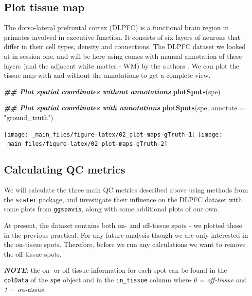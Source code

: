 \documentclass[
]{book}
\newenvironment{Shaded}{\begin{snugshade}}{\end{snugshade}}
\newcommand{\AttributeTok}[1]{\textcolor[rgb]{0.13,0.29,0.53}{#1}}
\newcommand{\DocumentationTok}[1]{\textcolor[rgb]{0.56,0.35,0.01}{\textbf{\textit{#1}}}}
\newcommand{\FunctionTok}[1]{\textcolor[rgb]{0.13,0.29,0.53}{\textbf{#1}}}
\newcommand{\NormalTok}[1]{#1}
\newcommand{\StringTok}[1]{\textcolor[rgb]{0.31,0.60,0.02}{#1}}
\begin{document}
\hypertarget{plot-tissue-map}{%
\subsection{Plot tissue map}\label{plot-tissue-map}}

The dorso-lateral prefrontal cortex (DLPFC) is a functional brain region in primates involved in executive function. It consists of six layers of neurons that differ in their cell types, density and connections. The DLPFC dataset we looked at in session one, and will be here using comes with manual annotation of these layers (and the adjacent white matter - WM) by the authors \citet{Maynard2021Mar}. We can plot the tissue map with and without the annotations to get a complete view.

\begin{Shaded}
\begin{Highlighting}[]
\DocumentationTok{\#\# Plot spatial coordinates without annotations}
\FunctionTok{plotSpots}\NormalTok{(spe)}

\DocumentationTok{\#\# Plot spatial coordinates with annotations}
\FunctionTok{plotSpots}\NormalTok{(spe,}
          \AttributeTok{annotate =} \StringTok{"ground\_truth"}\NormalTok{)}
\end{Highlighting}
\end{Shaded}

\texttt{[image: \_main\_files/figure-latex/02\_plot-maps-gTruth-1]} \texttt{[image: \_main\_files/figure-latex/02\_plot-maps-gTruth-2]}

\hypertarget{calculating-qc-metrics}{%
\subsection{Calculating QC metrics}\label{calculating-qc-metrics}}

We will calculate the three main QC metrics described above using methods from the \texttt{scater} \citep{McCarthy2017Apr} package, and investigate their influence on the DLPFC dataset with some plots from \texttt{ggspavis}, along with some additional plots of our own.

At present, the dataset contains both on- and off-tissue spots - we plotted these in the previous practical. For any future analysis though we are only interested in the on-tissue spots. Therefore, before we run any calculations we want to remove the off-tissue spots.

\textbf{\emph{NOTE}}: the on- or off-tissue information for each spot can be found in the \texttt{colData} of the \texttt{spe} object and in the \texttt{in\_tissue} column where \emph{0 = off-tissue} and \emph{1 = on-tissue}.
\end{document}
